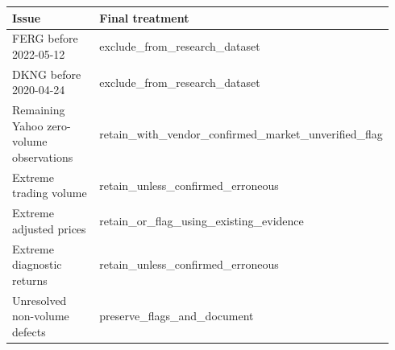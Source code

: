 \begin{tabular}{@{}p{0.42\linewidth}p{0.52\linewidth}@{}}
\toprule
Issue & Final treatment \\
\midrule
FERG before 2022-05-12 & exclude\_\allowbreak{}from\_\allowbreak{}research\_\allowbreak{}dataset \\
DKNG before 2020-04-24 & exclude\_\allowbreak{}from\_\allowbreak{}research\_\allowbreak{}dataset \\
Remaining Yahoo zero-volume observations & retain\_\allowbreak{}with\_\allowbreak{}vendor\_\allowbreak{}confirmed\_\allowbreak{}market\_\allowbreak{}unverified\_\allowbreak{}flag \\
Extreme trading volume & retain\_\allowbreak{}unless\_\allowbreak{}confirmed\_\allowbreak{}erroneous \\
Extreme adjusted prices & retain\_\allowbreak{}or\_\allowbreak{}flag\_\allowbreak{}using\_\allowbreak{}existing\_\allowbreak{}evidence \\
Extreme diagnostic returns & retain\_\allowbreak{}unless\_\allowbreak{}confirmed\_\allowbreak{}erroneous \\
Unresolved non-volume defects & preserve\_\allowbreak{}flags\_\allowbreak{}and\_\allowbreak{}document \\
\bottomrule
\end{tabular}
